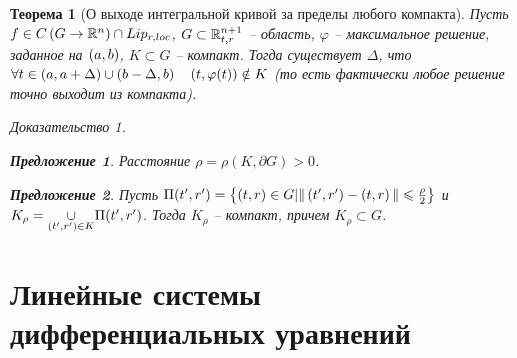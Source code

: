 \documentclass[a5paper, 10pt]{article}
\theoremstyle{definition}
\theoremstyle{plain}
\newtheorem{Th}{Теорема}
\newtheorem*{Prop}{Предложение}
\theoremstyle{remark}
\newtheorem*{Proof}{Доказательство}
\begin{document}
	\begin{Th}[О выходе интегральной кривой за пределы любого компакта]
		Пусть $f\in C\left(G\rightarrow \mathbb{R}^n\right) \cap Lip_{r, loc}$, $G\subset \mathbb{R}_{t,r}^{n+1}$ -- область, $\varphi$ -- максимальное решение, заданное на $\left(a,b\right)$, $K \subset G$ -- компакт. Тогда существует $\Delta$, что $\forall t\in\left(a, a+\Delta\right)\cup\left(b-\Delta, b\right) \quad \left(t,\varphi(t)\right) \notin K$ (то есть фактически любое решение точно выходит из компакта).
		\begin{Proof}
			\begin{Prop}
				Расстояние $\rho = \rho(K, \partial G) > 0$.
			\end{Prop}
			\begin{Prop}
				Пусть $\Pi(t',r') = \left\{\left(t,r\right)\in G | \|\left(t',r'\right) - \left(t,r\right)\|\leqslant \frac{\rho}{2}\right\}$ и $K_{\rho} = \underset{\left(t',r'\right)\in K}{\cup} \Pi(t',r')$. Тогда $K_{\rho}$ -- компакт, причем $K_{\rho} \subset G$.
			\end{Prop}
		\end{Proof}
	\end{Th}

	\part{Линейные системы дифференциальных уравнений}
	
	\section{}
	
\end{document}
